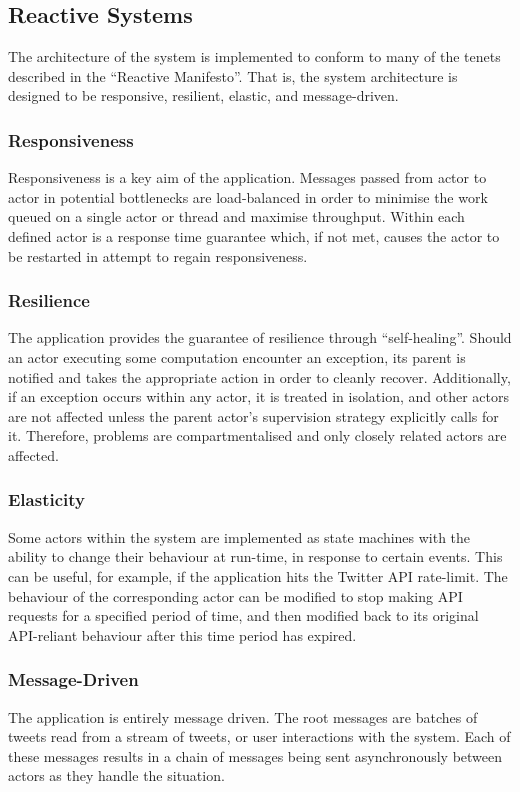 \documentclass{l4proj}
\begin{document}
        \subsection{Reactive Systems}
        The architecture of the system is implemented to conform to many of the tenets described in the ``Reactive Manifesto''. That is, the system architecture is designed to be responsive, resilient, elastic, and message-driven.
        
            \subsubsection{Responsiveness}
            Responsiveness is a key aim of the application. Messages passed from actor to actor in potential bottlenecks are load-balanced in order to minimise the work queued on a single actor or thread and maximise throughput. Within each defined actor is a response time guarantee which, if not met, causes the actor to be restarted in attempt to regain responsiveness. 
            
            \subsubsection{Resilience}
            The application provides the guarantee of resilience through ``self-healing''. Should an actor executing some computation encounter an exception, its parent is notified and takes the appropriate action in order to cleanly recover. Additionally, if an exception occurs within any actor, it is treated in isolation, and other actors are not affected unless the parent actor's supervision strategy explicitly calls for it. Therefore, problems are compartmentalised and only closely related actors are affected.
            
            \subsubsection{Elasticity}
            Some actors within the system are implemented as state machines with the ability to change their behaviour at run-time, in response to certain events. This can be useful, for example, if the application hits the Twitter API rate-limit. The behaviour of the corresponding actor can be modified to stop making API requests for a specified period of time, and then modified back to its original API-reliant behaviour after this time period has expired.
            
            \subsubsection{Message-Driven}
            The application is entirely message driven. The root messages are batches of tweets read from a stream of tweets, or user interactions with the system. Each of these messages results in a chain of messages being sent asynchronously between actors as they handle the situation.
\end{document}
